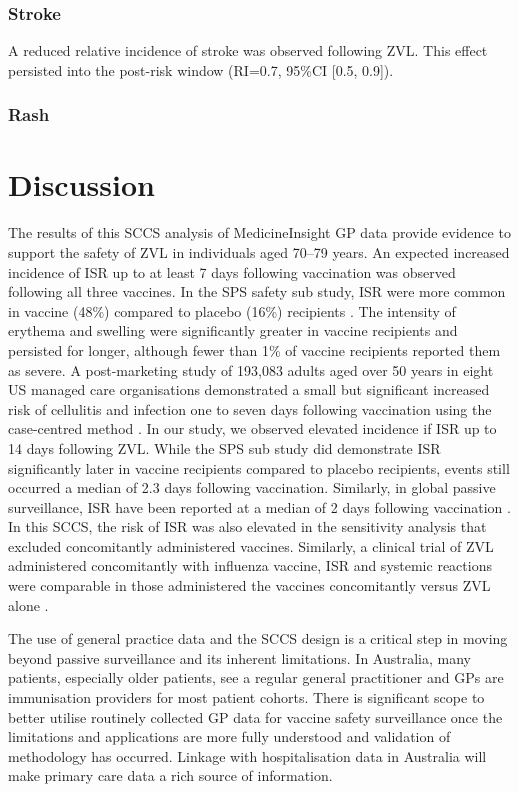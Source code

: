 \documentclass[review, endfloat]{elsarticle}
\begin{document}
\subsubsection{Stroke}

A reduced relative incidence of stroke was observed following ZVL. This effect persisted into the post-risk window (RI=0.7, 95\%CI [0.5, 0.9]). 

\subsubsection{Rash}

\section{Discussion}

The results of this SCCS analysis of MedicineInsight GP data provide evidence to support the safety of ZVL in individuals aged 70–79 years. An expected increased incidence of ISR up to at least 7 days following vaccination was observed following all three vaccines. In the SPS safety sub study, ISR were more common in vaccine (48\%) compared to placebo (16\%) recipients \citep{simberkoff2010}. The intensity of erythema and swelling were significantly greater in vaccine recipients and persisted for longer, although fewer than 1\% of vaccine recipients reported them as severe. A post-marketing study of 193,083 adults aged over 50 years in eight US managed care organisations demonstrated a small but significant increased risk of cellulitis and infection one to seven days following vaccination using the case-centred method \citep{tseng2012}. In our study, we observed elevated incidence if ISR up to 14 days following ZVL. While the SPS sub study did demonstrate ISR significantly later in vaccine recipients compared to placebo recipients, events still occurred a median of 2.3 days following vaccination. Similarly, in global passive surveillance, ISR have been reported at a median of 2 days following vaccination \citep{willis2017herpes}. In this SCCS, the risk of ISR was also elevated in the sensitivity analysis that excluded concomitantly administered vaccines. Similarly, a clinical trial of ZVL administered concomitantly with influenza vaccine, ISR and systemic reactions were comparable in those administered the vaccines concomitantly versus ZVL alone \citep{levin2018immunogenicity}.

The use of general practice data and the SCCS design is a critical step in moving beyond passive surveillance and its inherent limitations. In Australia, many patients, especially older patients, see a regular general practitioner and GPs are immunisation providers for most patient cohorts. There is significant scope to better utilise routinely collected GP data for vaccine safety surveillance once the limitations and applications are more fully understood and validation of methodology has occurred. Linkage with hospitalisation data in Australia will make primary care data a rich source of information.
\end{document}
